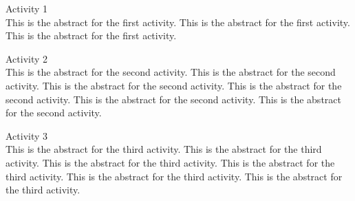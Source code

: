\pagestyle {empty}\flushleft 
{}Activity 1\\ This is the abstract for the first activity. This is the abstract for the first activity. This is the abstract for the first activity.\newpage 
{}Activity 2\\ This is the abstract for the second activity. This is the abstract for the second activity. This is the abstract for the second activity. This is the abstract for the second activity. This is the abstract for the second activity. This is the abstract for the second activity.\newpage 
{}Activity 3\\ This is the abstract for the third activity. This is the abstract for the third activity. This is the abstract for the third activity. This is the abstract for the third activity. This is the abstract for the third activity. This is the abstract for the third activity.\newpage 
\enddocument 
